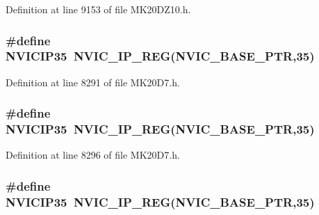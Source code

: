 Definition at line 9153 of file M\+K20\+D\+Z10.\+h.

\subsubsection[{\texorpdfstring{N\+V\+I\+C\+I\+P35}{NVICIP35}}]{\setlength{\rightskip}{0pt plus 5cm}\#define N\+V\+I\+C\+I\+P35~{\bf N\+V\+I\+C\+\_\+\+I\+P\+\_\+\+R\+EG}({\bf N\+V\+I\+C\+\_\+\+B\+A\+S\+E\+\_\+\+P\+TR},35)}\hypertarget{group___n_v_i_c___register___accessor___macros_gad761aef825b2419b7ba6245c4781be38}{}\label{group___n_v_i_c___register___accessor___macros_gad761aef825b2419b7ba6245c4781be38}


Definition at line 8291 of file M\+K20\+D7.\+h.

\subsubsection[{\texorpdfstring{N\+V\+I\+C\+I\+P35}{NVICIP35}}]{\setlength{\rightskip}{0pt plus 5cm}\#define N\+V\+I\+C\+I\+P35~{\bf N\+V\+I\+C\+\_\+\+I\+P\+\_\+\+R\+EG}({\bf N\+V\+I\+C\+\_\+\+B\+A\+S\+E\+\_\+\+P\+TR},35)}\hypertarget{group___n_v_i_c___register___accessor___macros_gad761aef825b2419b7ba6245c4781be38}{}\label{group___n_v_i_c___register___accessor___macros_gad761aef825b2419b7ba6245c4781be38}


Definition at line 8296 of file M\+K20\+D7.\+h.

\subsubsection[{\texorpdfstring{N\+V\+I\+C\+I\+P35}{NVICIP35}}]{\setlength{\rightskip}{0pt plus 5cm}\#define N\+V\+I\+C\+I\+P35~{\bf N\+V\+I\+C\+\_\+\+I\+P\+\_\+\+R\+EG}({\bf N\+V\+I\+C\+\_\+\+B\+A\+S\+E\+\_\+\+P\+TR},35)}\hypertarget{group___n_v_i_c___register___accessor___macros_gad761aef825b2419b7ba6245c4781be38}{}\label{group___n_v_i_c___register___accessor___macros_gad761aef825b2419b7ba6245c4781be38}


